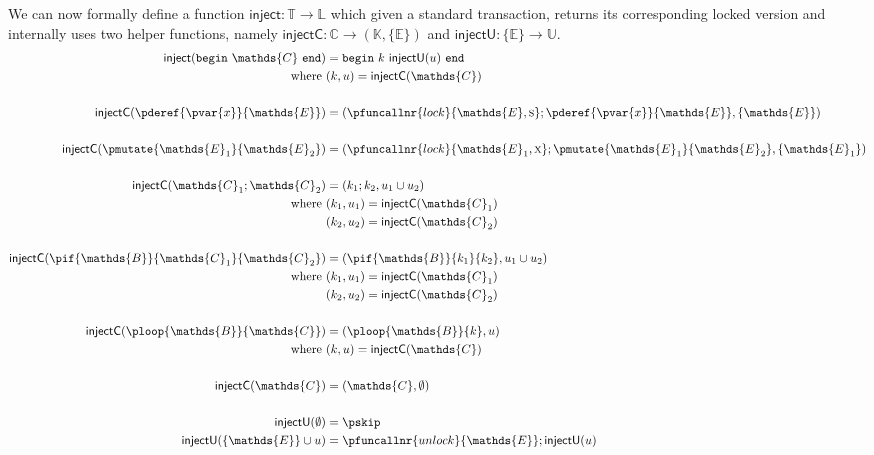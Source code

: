 We can now formally define a function $\textsf{inject} : \mathds{T} \rightarrow \mathds{L}$ which given a standard transaction, returns its corresponding locked version and internally uses two helper functions, namely $\textsf{injectC} : \mathds{C} \rightarrow (\mathds{K}, \{\mathds{E}\})$ and $\textsf{injectU} : \{\mathds{E}\} \rightarrow \mathds{U}$.
\begin{align*}
\textsf{inject}(\mathtt{begin}\ \mathds{C}\ \mathtt{end}) &= \mathtt{begin}\ k\ \textsf{injectU}(u)\ \mathtt{end} \\
\text{where } & (k, u) = \textsf{injectC}(\mathds{C}) \\
\\
\textsf{injectC}(\pderef{\pvar{x}}{\mathds{E}}) &= (\pfuncallnr{lock}{\mathds{E}, \textsc{s}}; \pderef{\pvar{x}}{\mathds{E}}, \{ \mathds{E} \}) \\
\\
\textsf{injectC}(\pmutate{\mathds{E}_1}{\mathds{E}_2}) &= (\pfuncallnr{lock}{\mathds{E}_1, \textsc{x}}; \pmutate{\mathds{E}_1}{\mathds{E}_2}, \{ \mathds{E}_1 \}) \\
\\
\textsf{injectC}(\mathds{C}_1; \mathds{C}_2) &= (k_1; k_2, u_1 \cup u_2) \\
\text{where } & (k_1, u_1) = \textsf{injectC}(\mathds{C}_1) \\
& (k_2, u_2) = \textsf{injectC}(\mathds{C}_2) \\
\\
\textsf{injectC}(\pif{\mathds{B}}{\mathds{C}_1}{\mathds{C}_2}) &= (\pif{\mathds{B}}{k_1}{k_2}, u_1 \cup u_2) \\
\text{where } & (k_1, u_1) = \textsf{injectC}(\mathds{C}_1) \\
& (k_2, u_2) = \textsf{injectC}(\mathds{C}_2) \\
\\
\textsf{injectC}(\ploop{\mathds{B}}{\mathds{C}}) &= (\ploop{\mathds{B}}{k}, u) \\
\text{where } & (k, u) = \textsf{injectC}(\mathds{C}) \\
\\
\textsf{injectC}(\mathds{C}) &= (\mathds{C}, \emptyset) \\
\\
\textsf{injectU}(\emptyset) &= \pskip \\ 
\textsf{injectU}(\{\mathds{E}\} \cup u) &= \pfuncallnr{unlock}{\mathds{E}}; \textsf{injectU}(u)
\end{align*}